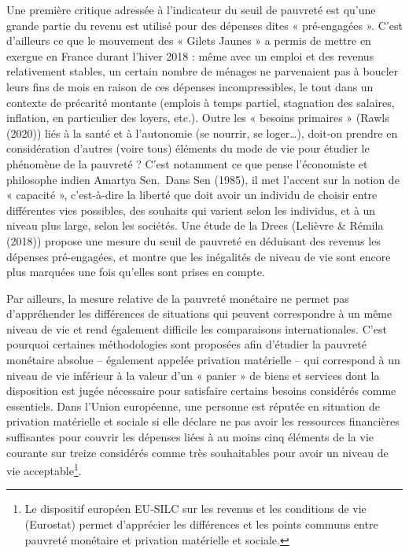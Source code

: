 \documentclass[12pt,a4paper]{reedthesis}
\begin{document}
Une première critique adressée à l'indicateur du seuil de pauvreté est qu'une grande partie du revenu est utilisé pour des dépenses dites « pré-engagées ». C'est d'ailleurs ce que le mouvement des « Gilets Jaunes » a permis de mettre en exergue en France durant l'hiver 2018 : même avec un emploi et des revenus relativement stables, un certain nombre de ménages ne parvenaient pas à boucler leurs fins de mois en raison de ces dépenses incompressibles, le tout dans un contexte de précarité montante (emplois à temps partiel, stagnation des salaires, inflation, en particulier des loyers, etc.). Outre les « besoins primaires » (Rawls (2020)) liés à la santé et à l'autonomie (se nourrir, se loger\ldots), doit-on prendre en considération d'autres (voire tous) éléments du mode de vie pour étudier le phénomène de la pauvreté ? C'est notamment ce que pense l'économiste et philosophe indien Amartya Sen.~Dans Sen (1985), il met l'accent sur la notion de « capacité », c'est-à-dire la liberté que doit avoir un individu de choisir entre différentes vies possibles, des souhaits qui varient selon les individus, et à un niveau plus large, selon les sociétés. Une étude de la Drees (Lelièvre \& Rémila (2018)) propose une mesure du seuil de pauvreté en déduisant des revenus les dépenses pré-engagées, et montre que les inégalités de niveau de vie sont encore plus marquées une fois qu'elles sont prises en compte.

Par ailleurs, la mesure relative de la pauvreté monétaire ne permet pas d'appréhender les différences de situations qui peuvent correspondre à un même niveau de vie et rend également difficile les comparaisons internationales. C'est pourquoi certaines méthodologies sont proposées afin d'étudier la pauvreté monétaire absolue -- également appelée privation matérielle -- qui correspond à un niveau de vie inférieur à la valeur d'un « panier » de biens et services dont la disposition est jugée nécessaire pour satisfaire certains besoins considérés comme essentiels. Dans l'Union européenne, une personne est réputée en situation de privation matérielle et sociale si elle déclare ne pas avoir les ressources financières suffisantes pour couvrir les dépenses liées à au moins cinq éléments de la vie courante sur treize considérés comme très souhaitables pour avoir un niveau de vie acceptable\footnote{Le dispositif européen EU‑SILC sur les revenus et les conditions de vie (Eurostat) permet d'apprécier les différences et les points communs entre pauvreté monétaire et privation matérielle et sociale.}.
\end{document}
